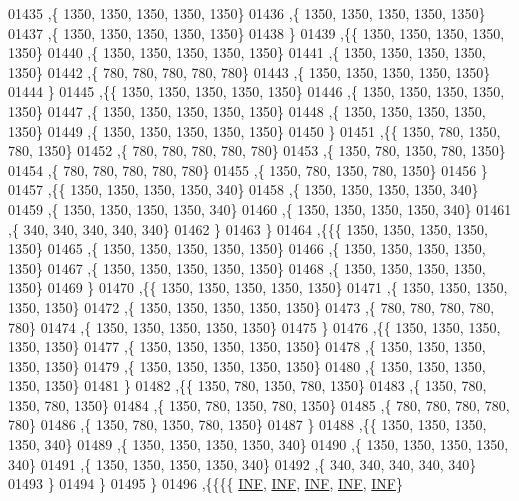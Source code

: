 \begin{DoxyCode}
01435    ,\{  1350,  1350,  1350,  1350,  1350\}
01436    ,\{  1350,  1350,  1350,  1350,  1350\}
01437    ,\{  1350,  1350,  1350,  1350,  1350\}
01438    \}
01439   ,\{\{  1350,  1350,  1350,  1350,  1350\}
01440    ,\{  1350,  1350,  1350,  1350,  1350\}
01441    ,\{  1350,  1350,  1350,  1350,  1350\}
01442    ,\{   780,   780,   780,   780,   780\}
01443    ,\{  1350,  1350,  1350,  1350,  1350\}
01444    \}
01445   ,\{\{  1350,  1350,  1350,  1350,  1350\}
01446    ,\{  1350,  1350,  1350,  1350,  1350\}
01447    ,\{  1350,  1350,  1350,  1350,  1350\}
01448    ,\{  1350,  1350,  1350,  1350,  1350\}
01449    ,\{  1350,  1350,  1350,  1350,  1350\}
01450    \}
01451   ,\{\{  1350,   780,  1350,   780,  1350\}
01452    ,\{   780,   780,   780,   780,   780\}
01453    ,\{  1350,   780,  1350,   780,  1350\}
01454    ,\{   780,   780,   780,   780,   780\}
01455    ,\{  1350,   780,  1350,   780,  1350\}
01456    \}
01457   ,\{\{  1350,  1350,  1350,  1350,   340\}
01458    ,\{  1350,  1350,  1350,  1350,   340\}
01459    ,\{  1350,  1350,  1350,  1350,   340\}
01460    ,\{  1350,  1350,  1350,  1350,   340\}
01461    ,\{   340,   340,   340,   340,   340\}
01462    \}
01463   \}
01464  ,\{\{\{  1350,  1350,  1350,  1350,  1350\}
01465    ,\{  1350,  1350,  1350,  1350,  1350\}
01466    ,\{  1350,  1350,  1350,  1350,  1350\}
01467    ,\{  1350,  1350,  1350,  1350,  1350\}
01468    ,\{  1350,  1350,  1350,  1350,  1350\}
01469    \}
01470   ,\{\{  1350,  1350,  1350,  1350,  1350\}
01471    ,\{  1350,  1350,  1350,  1350,  1350\}
01472    ,\{  1350,  1350,  1350,  1350,  1350\}
01473    ,\{   780,   780,   780,   780,   780\}
01474    ,\{  1350,  1350,  1350,  1350,  1350\}
01475    \}
01476   ,\{\{  1350,  1350,  1350,  1350,  1350\}
01477    ,\{  1350,  1350,  1350,  1350,  1350\}
01478    ,\{  1350,  1350,  1350,  1350,  1350\}
01479    ,\{  1350,  1350,  1350,  1350,  1350\}
01480    ,\{  1350,  1350,  1350,  1350,  1350\}
01481    \}
01482   ,\{\{  1350,   780,  1350,   780,  1350\}
01483    ,\{  1350,   780,  1350,   780,  1350\}
01484    ,\{  1350,   780,  1350,   780,  1350\}
01485    ,\{   780,   780,   780,   780,   780\}
01486    ,\{  1350,   780,  1350,   780,  1350\}
01487    \}
01488   ,\{\{  1350,  1350,  1350,  1350,   340\}
01489    ,\{  1350,  1350,  1350,  1350,   340\}
01490    ,\{  1350,  1350,  1350,  1350,   340\}
01491    ,\{  1350,  1350,  1350,  1350,   340\}
01492    ,\{   340,   340,   340,   340,   340\}
01493    \}
01494   \}
01495  \}
01496 ,\{\{\{\{   \mbox{\hyperlink{energy__const_8h_a12c2040f25d8e3a7b9e1c2024c618cb6}{INF}},   \mbox{\hyperlink{energy__const_8h_a12c2040f25d8e3a7b9e1c2024c618cb6}{INF}},   \mbox{\hyperlink{energy__const_8h_a12c2040f25d8e3a7b9e1c2024c618cb6}{INF}},   \mbox{\hyperlink{energy__const_8h_a12c2040f25d8e3a7b9e1c2024c618cb6}{INF}},   \mbox{\hyperlink{energy__const_8h_a12c2040f25d8e3a7b9e1c2024c618cb6}{INF}}\}

\end{DoxyCode}
